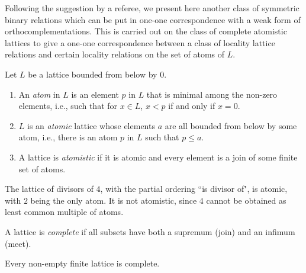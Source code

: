 \documentclass[pdftex]{sigma}
\numberwithin{equation}{section}
\begin{document}
Following the suggestion by a referee, we present here another class of symmetric binary relations which can be put in one-one correspondence with a weak form of orthocomplementations. This is carried out on the class of complete atomistic lattices to give a one-one correspondence between a class of locality lattice relations and certain locality relations on the set of atoms of $L$.
\begin{Definition}Let $L$ be a lattice bounded from below by $0$.
	\begin{enumerate}\itemsep=0pt
		\item An {\it atom} in $L$ is an element $p$ in $L$ that is minimal among the non-zero elements, i.e., such that for $x\in L$, $x< p$ if and only if $x=0$.
		\item $L$ is an {\it atomic} lattice whose elements $a$ are all bounded from below by some atom, i.e., there is an atom $p$ in $L$ such that $p\leq a$.
		\item
		A lattice is {\it atomistic} if it is atomic and every element is a join of some finite set of atoms.
	\end{enumerate}
\end{Definition}
\begin{Example}
	The lattice of divisors of $4$, with the partial ordering ``is divisor of", is atomic, with $2$ being the only atom. It is not atomistic, since $4$ cannot be obtained as least common multiple of atoms.
\end{Example}
\begin{Definition} A lattice is {\it complete} if all subsets have both a supremum (join) and an infimum (meet).
\end{Definition}\begin{Example} Every non-empty finite lattice is complete.
\end{Example}
\end{document}
